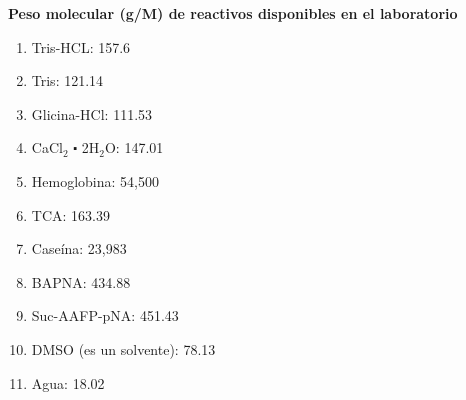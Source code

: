 \documentclass[12pt,a4paper]{article}
\begin{document}
\begin{multicols}{2}
\begin{Exercice}
\end{Exercice}

\begin{Exercice}\textbf{Peso molecular (g/M) de reactivos disponibles en el laboratorio}
	\begin{enumerate}[1)]
		\item Tris-HCL: 157.6 
		\item Tris: 121.14 
		\item Glicina-HCl: 111.53
		\item CaCl$_2$ $\centerdot$ 2H$_2$O: 147.01
		\item Hemoglobina: 54,500
		\item TCA: 163.39
		\item Case\'ina: 23,983
		\item BAPNA: 434.88
		\item Suc-AAFP-pNA: 451.43
		\item DMSO (es un solvente): 78.13
		\item Agua: 18.02 
	\end{enumerate}
\end{Exercice}

\end{multicols}
\end{document}
